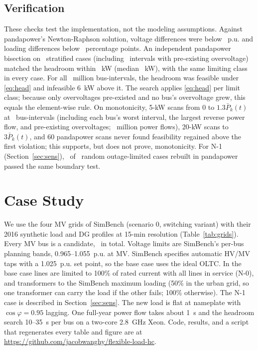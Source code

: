 \documentclass[conference,letterpaper]{IEEEtran}
\begin{document}
\subsection{Verification}\label{sec:val}
These checks test the implementation, not the modeling assumptions. Against pandapower's Newton-Raphson solution, voltage differences were below \maxdV~p.u. and loading differences below \maxdL~percentage points. An independent pandapower bisection on \audValN~stratified cases (including \audValOvt~intervals with pre-existing overvoltage) matched the headroom within \audValMax~kW (median \audValMed~kW), with the same limiting class in every case. For all \audBoundaryM~million bus-intervals, the headroom was feasible under \eqref{eq:head} and infeasible 6~kW above it. The search applies \eqref{eq:head} per limit class; because only overvoltages pre-existed and no bus's overvoltage grew, this equals the element-wise rule. On monotonicity, 5-kW scans from 0 to $1.3\bar P_k(t)$ at \fsCases~bus-intervals (including each bus's worst interval, the largest reverse power flow, and pre-existing overvoltages; \fsSteps~million power flows), 20-kW scans to $3\bar P_k(t)$, and 60 pandapower scans never found feasibility regained above the first violation; this supports, but does not prove, monotonicity. For N-1 (Section~\ref{sec:sens}), \nOnePPOK~of \nOnePPN~random outage-limited cases rebuilt in pandapower passed the same boundary test.

\section{Case Study}
We use the four MV grids of SimBench \cite{simbench} (scenario 0, switching variant) with their 2016 synthetic load and DG profiles at 15-min resolution (Table~\ref{tab:grids}). Every MV bus is a candidate, \nBus~in total. Voltage limits are SimBench's per-bus planning bands, 0.965--1.055~p.u. at MV. SimBench specifies automatic HV/MV taps with a 1.025~p.u. set point, so the base case uses the ideal OLTC. In the base case lines are limited to 100\% of rated current with all lines in service (N-0), and transformers to the SimBench maximum loading (50\% in the urban grid, so one transformer can carry the load if the other fails; 100\% otherwise). The N-1 case is described in Section~\ref{sec:sens}. The new load is flat at nameplate with $\cos\varphi=0.95$ lagging. One full-year power flow takes about 1~s and the headroom search 10--35~s per bus on a two-core 2.8~GHz Xeon. Code, results, and a script that regenerates every table and figure are at \url{https://github.com/jacobwanghy/flexible-load-hc}.
\end{document}

